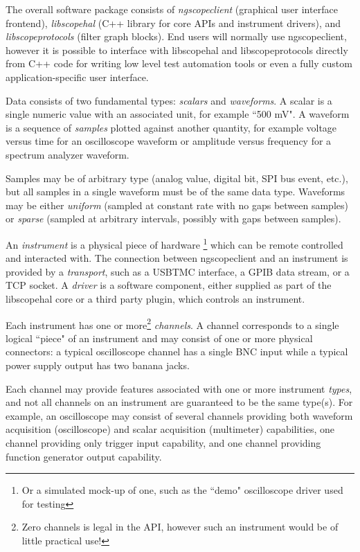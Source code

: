 The overall software package consists of \emph{ngscopeclient} (graphical user interface frontend), \emph{libscopehal}
(C++ library for core APIs and instrument drivers), and \emph{libscopeprotocols} (filter graph blocks). End users will
normally use ngscopeclient, however it is possible to interface with libscopehal and libscopeprotocols directly from
C++ code for writing low level test automation tools or even a fully custom application-specific user interface.

Data consists of two fundamental types: \emph{scalars} and \emph{waveforms}. A scalar is a single numeric value with an
associated unit, for example ``500 mV". A waveform is a sequence of \emph{samples} plotted against another quantity, for
example voltage versus time for an oscilloscope waveform or amplitude versus frequency for a spectrum analyzer
waveform.

Samples may be of arbitrary type (analog value, digital bit, SPI bus event, etc.), but all samples in a
single waveform must be of the same data type. Waveforms may be either \emph{uniform} (sampled at constant rate with no
gaps between samples) or \emph{sparse} (sampled at arbitrary intervals, possibly with gaps between samples).

An \emph{instrument} is a physical piece of hardware \footnote{Or a simulated mock-up of one, such as the ``demo"
oscilloscope driver used for testing} which can be remote controlled and interacted with. The connection between
ngscopeclient and an instrument is provided by a \emph{transport}, such as a USBTMC interface, a GPIB data stream, or a
TCP socket. A \emph{driver} is a software component, either supplied as part of the libscopehal core or a third party
plugin, which controls an instrument.

Each instrument has one or more\footnote{Zero channels is legal in the API, however such an instrument would be of
little practical use!} \emph{channels}. A channel corresponds to a single logical ``piece" of an instrument and may
consist of one or more physical connectors: a typical oscilloscope channel has a single BNC input while a typical power
supply output has two banana jacks.

Each channel may provide features associated with one or more instrument \emph{types}, and not all channels on an
instrument are guaranteed to be the same type(s). For example, an oscilloscope may consist of several channels
providing both waveform acquisition (oscilloscope) and scalar acquisition (multimeter) capabilities, one channel
providing only trigger input capability, and one channel providing function generator output capability.

